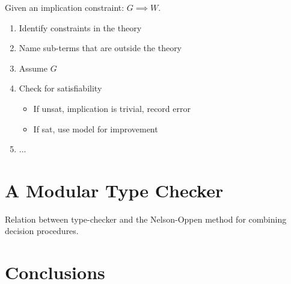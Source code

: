 \documentclass{sigplanconf}
\begin{document}
Given an implication constraint: $G\implies W$.
\begin{enumerate}
\item Identify constraints in the theory
\item Name sub-terms that are outside the theory
\item Assume $G$
\item Check for satisfiability
  \begin{itemize}
  \item If unsat, implication is trivial, record error
  \item If sat, use model for improvement
  \end{itemize}
\item ...
\end{enumerate}


\section{A Modular Type Checker}

Relation between type-checker and
the Nelson-Oppen method for combining
decision procedures.


\section {Conclusions}









% 
% 
% 
% 
\end{document}
